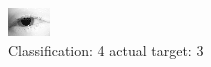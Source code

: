 \begin{figure}[h!]
\begin{center}
\includegraphics[width=0.60\columnwidth]{figures/ID172_class_4_target_3.png}
\end{center}
\caption{ Classification: 4 actual target: 3}
\label{fig:ID172_class_4_target_3}
\end{figure}
